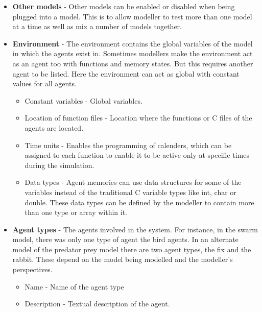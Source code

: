 \begin{itemize}
\item \textbf{Other models} - Other models can be enabled or disabled when being plugged into a model. This is to allow modeller to test more than one model at a time as well as mix a number of models together.
\item \textbf{Environment} - The environment contains the global variables of the model in which the agents exist in. Sometimes modellers make the environment act as an agent too with functions and memory states. But this requires another agent to be listed. Here the environment can act as global with constant values for all agents.
\begin{itemize}
\item Constant variables - Global variables.
\item Location of function files - Location where the functions or C files of the agents are located. 
\item Time units - Enables the programming of calenders, which can be assigned to each function to enable it to be active only at specific times during the simulation.
\item Data types - Agent memories can use data structures for some of the variables instead of the traditional C variable types like int, char or double. These data types can be defined by the modeller to contain more than one type or array within it.
\end{itemize}
\item \textbf{Agent types} - The agents involved in the system. For instance, in the swarm model, there was only one type of agent the bird agents. In an alternate model of the predator prey model there are two agent types, the fix and the rabbit. These depend on the model being modelled and the modeller's perspectives.
\begin{itemize}
\item Name - Name of the agent type
\item Description - Textual description of the agent.

\end{itemize}
\end{itemize}
